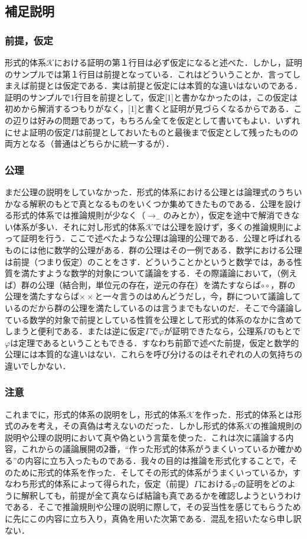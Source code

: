 \documentclass[10pt,b5paper,papersize,dvipdfmx]{jsbook}
\newcommand\maru[1]{\textcircled{\scriptsize{}#1}}
\newcommand\DQ[1]{“#1”}
\begin{document}
\subsection{補足説明}
\subsubsection{前提，仮定}
形式的体系$\mathcal K$における証明の第１行目は必ず仮定になると述べた．しかし，証明のサンプルでは第１行目は前提となっている．これはどういうことか．言ってしまえば前提とは仮定である．実は前提と仮定には本質的な違いはないのである．証明のサンプルで1行目を前提として，仮定[1]と書かなかったのは，この仮定は初めから解消するつもりがなく，[1]と書くと証明が見づらくなるからである．この辺りは好みの問題であって，もちろん全てを仮定として書いてもよい．いずれにせよ証明の仮定$\Gamma$は前提としておいたものと最後まで仮定として残ったものの両方となる（普通はどちらかに統一するが）．

\subsubsection{公理}
まだ公理の説明をしていなかった．形式的体系における公理とは論理式のうちいかなる解釈のもとで真となるものをいくつか集めてきたものである．公理を設ける形式的体系では推論規則が少なく（$\to_-$のみとか），仮定を途中で解消できない体系が多い．それに対し形式的体系$\mathcal K$では公理を設けず，多くの推論規則によって証明を行う．ここで述べたような公理は論理的公理である．公理と呼ばれるものには他に数学的公理がある．群の公理はその一例である．数学における公理は前提（つまり仮定）のことをさす．どういうことかというと数学では，ある性質を満たすような数学的対象について議論をする．その際議論において，（例えば）群の公理（結合則，単位元の存在，逆元の存在）を満たすならば$\circ \circ$，群の公理を満たすならば$\times \times$と一々言うのはめんどうだし，今，群について議論しているのだから群の公理を満たしているのは言うまでもないのだ．そこで今議論している数学的対象で前提としている性質を公理として形式的体系のなかに含めてしまうと便利である．または逆に仮定$\Gamma$で$\varphi$が証明できたなら，公理系$\Gamma$のもとで$\varphi$は定理であるということもできる．すなわち前節で述べた前提，仮定と数学的公理には本質的な違いはない．これらを呼び分けるのはそれぞれの人の気持ちの違いでしかない．

\subsubsection{注意}
これまでに，形式的体系の説明をし，形式的体系$\mathcal K$を作った．形式的体系とは形式のみを考え，その真偽は考えないのだった．しかし$形式的体系\mathcal K$の推論規則の説明や公理の説明において真や偽という言葉を使った．これは次に議論する内容，これからの議論展開の\maru{2}番，\DQ{作った形式的体系がうまくいっているか確かめる}の内容に立ち入ったものである．我々の目的は推論を形式化することで，そのために形式的体系を作った．そしてその形式的体系がうまくいっているか，すなわち形式的体系によって得られた，仮定（前提）$\Gamma$における$\varphi$の証明をどのように解釈しても，前提が全て真ならば結論も真であるかを確認しようというわけである．そこで推論規則や公理の説明に際して，その妥当性を感じてもらうために先にこの内容に立ち入り，真偽を用いた次第である．混乱を招いたなら申し訳ない．
\end{document}
